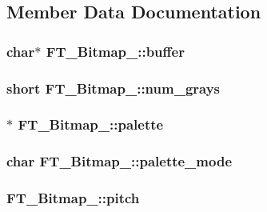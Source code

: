 \subsection{Member Data Documentation}
\hypertarget{struct_f_t___bitmap___a76439b1d3c13b81ca506108cd1623284}{
\subsubsection[{buffer}]{ char$\ast$ F\-T\-\_\-\-Bitmap\-\_\-\-::buffer}}\label{struct_f_t___bitmap___a76439b1d3c13b81ca506108cd1623284}
\hypertarget{struct_f_t___bitmap___a415d78060f8012d312703c9792ec005a}{
\subsubsection[{num\-\_\-grays}]{\setlength{\rightskip}{0pt plus 5cm}short F\-T\-\_\-\-Bitmap\-\_\-\-::num\-\_\-grays}}\label{struct_f_t___bitmap___a415d78060f8012d312703c9792ec005a}
\hypertarget{struct_f_t___bitmap___a8d5ecf4409f71bfb559e0d13d8df4d86}{
\subsubsection[{palette}]{$\ast$ F\-T\-\_\-\-Bitmap\-\_\-\-::palette}}\label{struct_f_t___bitmap___a8d5ecf4409f71bfb559e0d13d8df4d86}
\hypertarget{struct_f_t___bitmap___ae7c8c74255cd27873b12a360cd5f3884}{
\subsubsection[{palette\-\_\-mode}]{\setlength{\rightskip}{0pt plus 5cm}char F\-T\-\_\-\-Bitmap\-\_\-\-::palette\-\_\-mode}}\label{struct_f_t___bitmap___ae7c8c74255cd27873b12a360cd5f3884}
\hypertarget{struct_f_t___bitmap___afdee595846e1188c7a76d0cec9d85cf2}{
\subsubsection[{pitch}]{ F\-T\-\_\-\-Bitmap\-\_\-\-::pitch}}\label{struct_f_t___bitmap___afdee595846e1188c7a76d0cec9d85cf2}

